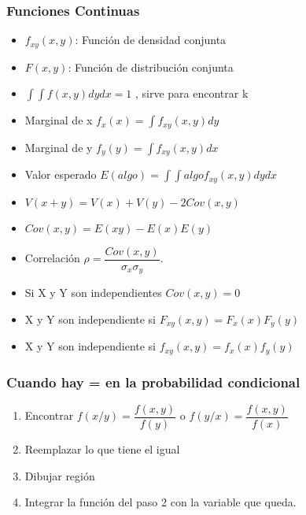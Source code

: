 \subsubsection{Funciones Continuas}

\begin{itemize}
	\item $f_{xy}(x,y)$: Función de densidad conjunta
	\item $F(x,y)$: Función de distribución conjunta
	\item $\int \int f(x,y)dydx=1$ , sirve para encontrar k
	\item Marginal de x $f_x(x)=\int f_{xy}(x,y)dy$
	\item Marginal de y $f_y(y)=\int f_{xy}(x,y)dx$
	\item Valor esperado $E(algo)=\int \int algof_{xy}(x,y)dydx$
	\item $V(x+y)=V(x)+V(y)-2Cov(x,y)$
	\item $Cov(x,y)=E(xy)-E(x)E(y)$
	\item Correlación $\rho=\dfrac{Cov(x,y)}{\sigma_x\sigma_y}$.
	\item Si X y Y son independientes $Cov(x,y)=0$
	\item X y Y son independiente si $F_{xy}(x,y) = F_x(x)F_y(y)$
	\item X y Y son independiente si $f_{xy}(x,y) = f_x(x)f_y(y)$
	
\end{itemize}

\subsubsection{Cuando hay = en la probabilidad condicional}
\begin{enumerate}
	\item Encontrar $f(x/y)=\dfrac{f(x,y)}{f(y)}$ o $f(y/x)=\dfrac{f(x,y)}{f(x)}$
	\item Reemplazar lo que tiene el igual
	\item Dibujar región
	\item Integrar la función del paso 2 con la variable que queda.
\end{enumerate}